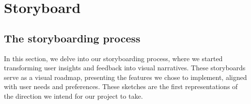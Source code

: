 \section{Storyboard}
\subsection{The storyboarding process}
In this section, we delve into our storyboarding process, where we started transforming user insights and feedback into visual narratives.  These storyboards serve as a visual roadmap, presenting the features we chose to implement, aligned with user needs and preferences. These sketches are the first representations of the direction we intend for our project to take.